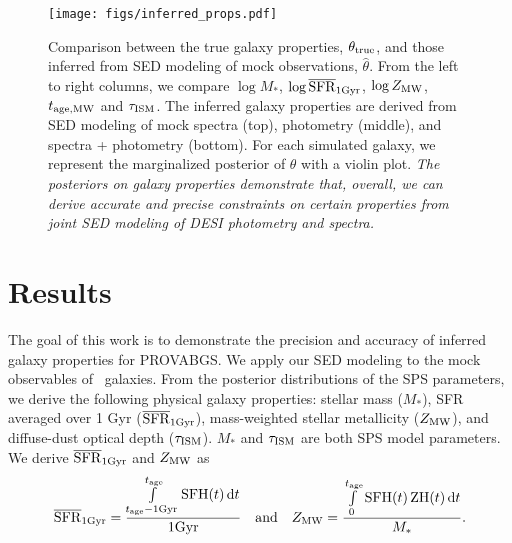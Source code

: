 \begin{figure}
\begin{center}
\texttt{[image: figs/inferred\_props.pdf]}
\caption{
    Comparison between the true galaxy properties, $\theta_{\rm true}$, and
    those inferred from SED modeling of mock observations, $\hat{\theta}$. 
    From the left to right columns, we compare $\log M_*$, $\log \overline{\rm SFR}_{\rm 1Gyr}$, 
    $\log Z_{\rm MW}$, $t_{\rm age, MW}$ and $\tau_{\rm ISM}$. 
    The inferred galaxy properties are derived from SED modeling of mock
    spectra (top), photometry (middle), and spectra + photometry (bottom). 
    For each simulated galaxy, we represent the marginalized posterior of
    $\theta$ with a violin plot.  %
    \emph{The posteriors on galaxy properties demonstrate that, overall, we can
    derive accurate and precise constraints on certain properties from joint
    SED modeling of DESI photometry and spectra.}
    } \label{fig:prop_inf}
\end{center}
\end{figure}

\section{Results} \label{sec:results}
The goal of this work is to demonstrate the precision and accuracy of inferred
galaxy properties for PROVABGS. 
We apply our SED modeling to the mock observables of  \lgal~galaxies.
From the posterior distributions of the SPS parameters, we derive the following
physical galaxy properties: stellar mass ($M_*$), SFR averaged over 1 Gyr
($\overline{\rm SFR}_{\rm 1Gyr}$), mass-weighted stellar metallicity ($Z_{\rm MW}$), and diffuse-dust
optical depth ($\tau_{\rm ISM}$).
$M_*$ and $\tau_{\rm ISM}$ are both SPS model parameters. 
We derive $\overline{\rm SFR}_{\rm 1Gyr}$ and $Z_{\rm MW}$ as 
\begin{equation}
    \avgsfr = \frac{\int\limits_{t_{\rm age} - {\rm 1 Gyr}}^{t_{\rm age}}{\rm
    SFH}(t)\,{\rm d}t}{{\rm 1 Gyr}} \quad{\rm and}\quad
    Z_{\rm MW} = \frac{\int\limits_0^{t_{\rm age}}{\rm SFH}(t)\,{\rm
    ZH}(t)\,{\rm d}t}{M_*}.
\end{equation} 

